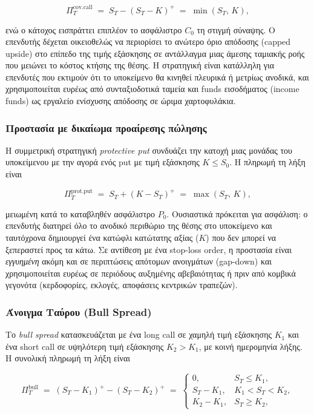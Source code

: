 \documentclass[12pt]{article}
\begin{document}
$$
\Pi^{\text{cov.call}}_T \;=\; S_T - (S_T - K)^+ \;=\; \min(S_T,\, K),
$$

ενώ ο κάτοχος εισπράττει επιπλέον το ασφάλιστρο $C_0$ τη στιγμή σύναψης. Ο επενδυτής δέχεται οικειοθελώς να περιορίσει το ανώτερο όριο απόδοσης (capped upside) στο επίπεδο της τιμής εξάσκησης σε αντάλλαγμα μιας άμεσης ταμιακής ροής που μειώνει το κόστος κτήσης της θέσης. Η στρατηγική είναι κατάλληλη για επενδυτές που εκτιμούν ότι το υποκείμενο θα κινηθεί πλευρικά ή μετρίως ανοδικά, και χρησιμοποιείται ευρέως από συνταξιοδοτικά ταμεία και funds εισοδήματος (income funds) ως εργαλείο ενίσχυσης απόδοσης σε ώριμα χαρτοφυλάκια.

\subsubsection{Προστασία με δικαίωμα προαίρεσης πώλησης}

Η συμμετρική στρατηγική \emph{protective put} συνδυάζει την κατοχή μιας μονάδας του υποκείμενου με την αγορά ενός put με τιμή εξάσκησης $K \leq S_0$. Η πληρωμή τη λήξη είναι

$$
\Pi^{\text{prot.put}}_T \;=\; S_T + (K - S_T)^+ \;=\; \max(S_T,\, K),
$$

μειωμένη κατά το καταβληθέν ασφάλιστρο $P_0$. Ουσιαστικά πρόκειται για ασφάλιση: ο επενδυτής διατηρεί όλο το ανοδικό περιθώριο της θέσης στο υποκείμενο και ταυτόχρονα δημιουργεί ένα κατώφλι κατώτατης αξίας ($K$) που δεν μπορεί να ξεπεραστεί προς τα κάτω. Σε αντίθεση με ένα stop-loss order, η προστασία είναι \emph{εγγυημένη} ακόμη και σε περιπτώσεις απότομων ανοιγμάτων (gap-down) και χρησιμοποιείται ευρέως σε περιόδους αυξημένης αβεβαιότητας ή πριν από κομβικά γεγονότα (κερδοφορίες, εκλογές, αποφάσεις κεντρικών τραπεζών).

\subsubsection{Άνοιγμα Ταύρου (Bull Spread)}

Το \emph{bull spread} κατασκευάζεται με ένα long call σε χαμηλή τιμή εξάσκησης $K_1$ και ένα short call σε υψηλότερη τιμή εξάσκησης $K_2 > K_1$, με κοινή ημερομηνία λήξης. Η συνολική πληρωμή τη λήξη είναι

$$
\Pi^{\text{bull}}_T \;=\; (S_T - K_1)^+ - (S_T - K_2)^+ \;=\;
\begin{cases}
0, & S_T \leq K_1, \\
S_T - K_1, & K_1 < S_T < K_2, \\
K_2 - K_1, & S_T \geq K_2,
\end{cases}
$$
\end{document}
